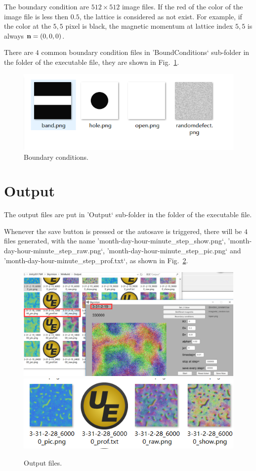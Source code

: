 \documentclass[aps,superscriptaddress,groupedaddress]{revtex4}  %
\begin{document}
The boundary condition are $512\times 512$ image files. If the red of the color of the image file is less then $0.5$, the lattice is considered as not exist. For example, if the color at the $5, 5$ pixel is black, the magnetic momentum at lattice index $5,5$ is always ${\bf n}=(0,0,0)$.

There are $4$ common boundary condition files in 'BoundConditions` sub-folder in the folder of the executable file, they are shown in Fig.~\ref{Fig:boundary}.
\begin{figure}
\includegraphics[scale=0.5]{boundary.png}
\caption{\label{Fig:boundary}Boundary conditions.}
\end{figure}

\section{\label{sec:5}Output}

The output files are put in 'Output` sub-folder in the folder of the executable file.

Whenever the save button is pressed or the autosave is triggered, there will be $4$ files generated, with the name 'month-day-hour-minute\_step\_show.png`, 'month-day-hour-minute\_step\_raw.png`, 'month-day-hour-minute\_step\_pic.png` and 'month-day-hour-minute\_step\_prof.txt`, as shown in Fig.~\ref{Fig:output}.
\begin{figure}
\includegraphics[scale=0.5]{intro4.png}
\includegraphics[scale=0.5]{output1.png}
\caption{\label{Fig:output}Output files.}
\end{figure}
\end{document}
